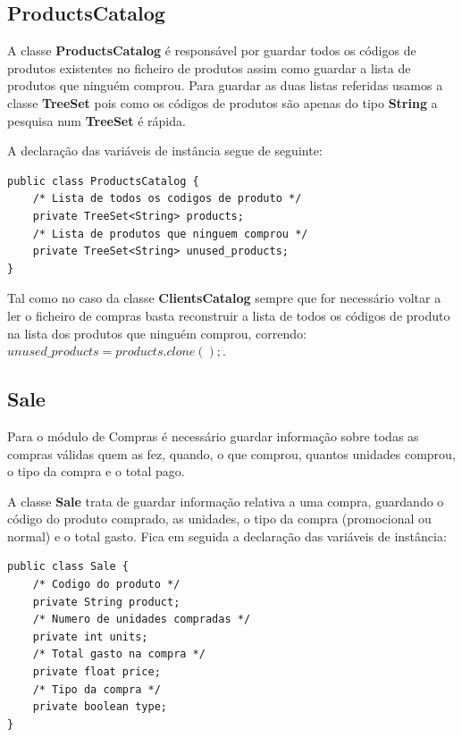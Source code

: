 \documentclass[10pt] {article}
\begin{document}
\subsection{ProductsCatalog}

A classe \color{blue} \textbf{ProductsCatalog} \color{black} é responsável por guardar todos os códigos de produtos existentes 
no ficheiro de produtos assim como guardar a lista de produtos que ninguém comprou.
Para guardar as duas listas referidas usamos a classe \color{blue} \textbf{TreeSet} \color{black} pois como os códigos de 
produtos são apenas do tipo \color{blue} \textbf{String} \color{black} a pesquisa num \color{blue} \textbf{TreeSet} \color{black}é 
rápida.

A declaração das variáveis de instância segue de seguinte:

\begin{lstlisting}
public class ProductsCatalog {
	/* Lista de todos os codigos de produto */
	private TreeSet<String> products;
	/* Lista de produtos que ninguem comprou */
	private TreeSet<String> unused_products;
}
\end{lstlisting}


Tal como no caso da classe \color{blue} \textbf{ClientsCatalog} \color{black} sempre que for necessário voltar a ler o ficheiro de 
compras basta reconstruir a lista de todos os códigos de produto na lista dos produtos que ninguém comprou, correndo:
$unused\_products = products.clone();$.

\newpage
\subsection{Sale}

Para o módulo de Compras é necessário guardar informação sobre todas as compras válidas quem as fez, quando, o que comprou, quantos unidades comprou, o tipo da compra e o total pago.

A classe \color{blue} \textbf{Sale} \color{black} trata de guardar informação relativa a uma compra, guardando o código do 
produto comprado, as unidades, o tipo da compra (promocional ou normal) e o total gasto.
Fica em seguida a declaração das variáveis de instância:

\begin{lstlisting}
public class Sale {
	/* Codigo do produto */
	private String product;
	/* Numero de unidades compradas */
	private int units;
	/* Total gasto na compra */
	private float price;
	/* Tipo da compra */
	private boolean type;
}
\end{lstlisting}
\end{document}
